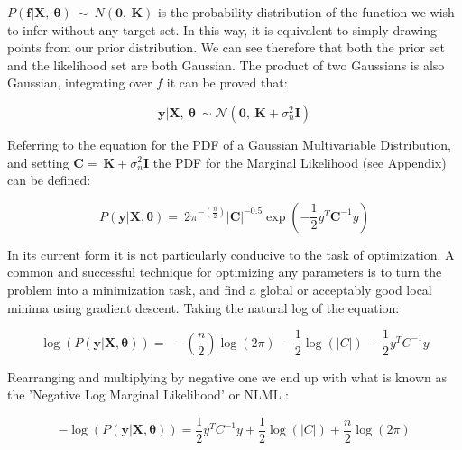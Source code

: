 \documentclass[10.5pt,a4paper,twoside]{report}   %
\begin{document}
$P\left(\boldsymbol{f}\boldsymbol{|}\boldsymbol{X}\boldsymbol{,\ }\boldsymbol{\theta }\right)\ \sim \ N\left(\boldsymbol{0}\boldsymbol{,\ }\boldsymbol{K}\right)$ is the probability distribution of the function we wish to infer without any target set. In this way, it is equivalent to simply drawing points from our prior distribution. We can see therefore that both the prior set and the likelihood set are both Gaussian.  The product of two Gaussians is also Gaussian, integrating over $f$ it can be proved that\cite{MITGPRbook}:

\begin{equation}
 \boldsymbol{y}\boldsymbol{|}\boldsymbol{X}\boldsymbol{,\ }\boldsymbol{\theta }\ \sim  \mathcal{N}(\boldsymbol{0},\ \boldsymbol{K}+{\sigma }^2_n\boldsymbol{I})
\end{equation}
 
Referring to the equation for the PDF of a Gaussian Multivariable Distribution, and setting $\boldsymbol{C}=\ \boldsymbol{K}+{\sigma }^2_n\boldsymbol{I}$ the PDF for the Marginal Likelihood (see Appendix) can be defined:

\begin{equation}
P\left(\boldsymbol{y}|\boldsymbol{X,\theta}\right)=\ {2\pi }^{-\left(\frac{n}{2}\right)}{\left|\boldsymbol{C}\right|}^{-0.5}\exp\left(-\frac{1}{2}y^T{\boldsymbol{C}}^{-1}y\right)
\end{equation}

In its current form it is not particularly conducive to the task of optimization. A common and successful technique for optimizing any parameters is to turn the problem into a minimization task, and find a global or acceptably good local minima using gradient descent. Taking the natural log of the equation:

\begin{equation}
\log \left( P\left(\boldsymbol{y}|\boldsymbol{X,\theta} \right)\right)=\ -\left(\frac{n}{2}\right){\log  \left(2\pi \right)\ }-\frac{1}{2}{\log  \left(\left|C\right|\right)\ }-\frac{1}{2}y^TC^{-1}y
\end{equation}

Rearranging and multiplying by negative one we end up with what is known as the 'Negative Log Marginal Likelihood' or NLML \cite{camgpr,edsnelgpr}:

\begin{equation}
-\log  \left(P\left(\boldsymbol{y}|\boldsymbol{X,\theta}\right)\right)=
\frac{1}{2}y^TC^{-1}y +\frac{1}{2}{\log  \left(\left|C\right|\right)}
+\frac{n}{2}{\log  \left(2\pi \right)}
\end{equation} 
\end{document}
